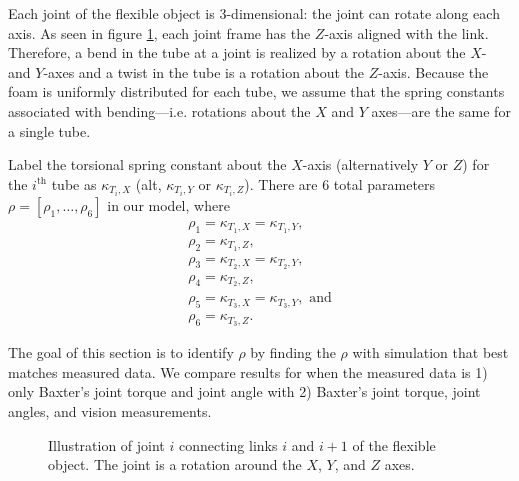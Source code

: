 \documentclass[runningheads,a4paper]{llncs}
\begin{document}
Each joint of the flexible object is 3-dimensional: the joint can rotate along each axis. As seen in figure \ref{fig-tube_link}, each joint frame has the $Z$-axis aligned with the link. Therefore, a bend in the tube at a joint is realized by a rotation about the $X$- and $Y$-axes and a twist in the tube is a rotation about the $Z$-axis. Because the foam is uniformly distributed for each tube, we assume that the spring constants associated with bending---i.e. rotations about the $X$ and $Y$ axes---are the same for a single tube. 

Label the torsional spring constant about the $X$-axis (alternatively $Y$ or $Z$) for the $i^{\textrm{th}}$ tube as $\kappa_{T_i,X}$ (alt, $\kappa_{T_i,Y}$ or $\kappa_{T_i,Z}$). There are 6 total parameters $\rho = [\rho_1,\ldots,\rho_6]$ in our model, where 
\begin{equation}
\begin{array}{l}
\rho_1 = \kappa_{T_1,X} = \kappa_{T_1,Y}, \\
\rho_2 = \kappa_{T_1,Z}, \\
\rho_3 = \kappa_{T_2,X} = \kappa_{T_2,Y}, \\
\rho_4 = \kappa_{T_2,Z} , \\
\rho_5 = \kappa_{T_3,X} = \kappa_{T_3,Y}, \textrm{ and} \\
\rho_6 = \kappa_{T_3,Z}. 
\end{array}
\label{eq-params}
\end{equation}

The goal of this section is to identify $\rho$ by finding the $\rho$ with simulation that best matches measured data.  We compare results for when the measured data is 1) only Baxter's joint torque and joint angle with 2) Baxter's joint torque, joint angles, and vision measurements.

\begin{figure}[!htb]
\centering
\def\svgwidth{.80\textwidth}%

\caption{Illustration of joint $i$ connecting links $i$ and $i+1$ of the flexible object.  The joint is a rotation around the $X$, $Y$, and $Z$ axes.}
\label{fig-tube_link}
\end{figure}
\end{document}

